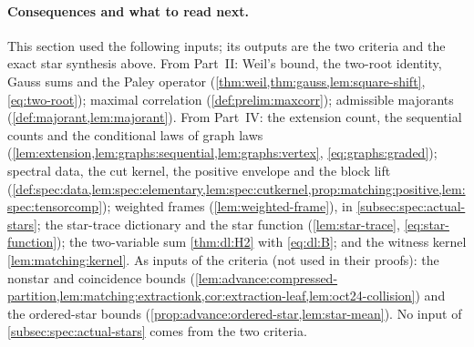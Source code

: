 \paragraph{Consequences and what to read next.}
This section used the following inputs; its outputs are the two criteria and the exact star synthesis above.
From Part~II: Weil's bound, the two-root identity, Gauss sums and the Paley operator
(\cref{thm:weil,thm:gauss,lem:square-shift}, \eqref{eq:two-root}); maximal correlation
(\cref{def:prelim:maxcorr}); admissible majorants
(\cref{def:majorant,lem:majorant}). From Part~IV: the extension count, the sequential
counts and the conditional laws of graph laws
(\cref{lem:extension,lem:graphs:sequential,lem:graphs:vertex},
\eqref{eq:graphs:graded}); spectral data, the cut kernel, the positive envelope and the
block lift (\cref{def:spec:data,lem:spec:elementary,lem:spec:cutkernel,prop:matching:positive,lem:spec:tensorcomp});
weighted frames (\cref{lem:weighted-frame}), in \cref{subsec:spec:actual-stars};
the star-trace dictionary and the star function (\cref{lem:star-trace},
\eqref{eq:star-function}); the two-variable sum \cref{thm:dl:H2} with \eqref{eq:dl:B}; and
the witness kernel \cref{lem:matching:kernel}. As inputs of the criteria (not used in
their proofs): the nonstar and coincidence bounds
(\cref{lem:advance:compressed-partition,lem:matching:extractionk,cor:extraction-leaf,lem:oct24-collision}) and
the ordered-star bounds (\cref{prop:advance:ordered-star,lem:star-mean}). No input of
\cref{subsec:spec:actual-stars} comes from the two criteria.
